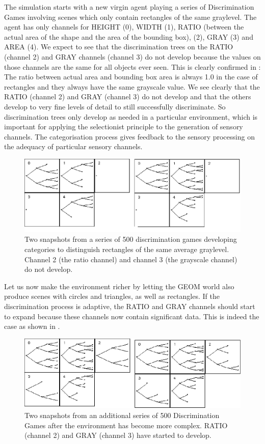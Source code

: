 The simulation starts with a new virgin agent 
playing a series of Discrimination Games involving scenes
which only contain rectangles of the same graylevel. 
The agent has only channels for HEIGHT (0), WIDTH (1), 
RATIO (between the actual area of the shape 
and the area of the bounding box),
(2), GRAY (3) and AREA (4). We expect
to see that the discrimination trees on the RATIO (channel 
2) and GRAY channels (channel 3) do not develop because 
the values on those channels 
are the same for all objects ever seen. This is 
clearly confirmed in : The ratio
between actual area and bounding box area is always 1.0
in the case of rectangles and they always have the same
grayscale value. 
We see clearly that the RATIO (channel 2) and GRAY (channel 3) 
do not develop and that the others develop to very 
fine levels of detail to still successfully discriminate. 
So discrimination trees only 
develop as needed in a particular environment, which is 
important for applying the selectionist
principle to the generation of sensory channels. 
The categorisation process gives feedback to 
the sensory processing on the adequacy of particular sensory 
channels. 

\begin{figure}[htbp]
  \centerline{\includegraphics[width=.65\textwidth]{chap4/figs/adptwrl1.pdf}}
\caption{\label{adptwrl1}Two snapshots 
from a series of 500 discrimination 
games developing categories to distinguish rectangles of 
the same average graylevel. Channel 2 (the ratio channel) 
and channel 3 (the grayscale channel) do not develop.}
\end{figure}

Let us now make the environment richer by letting the 
GEOM world also produce scenes with circles and triangles, 
as well as rectangles. If the discrimination 
process is adaptive, the RATIO and GRAY channels should
start to expand because these channels now contain
significant data. This is indeed the case as shown 
in . 

\begin{figure}[htbp]
  \centerline{\includegraphics[width=.65\textwidth]{chap4/figs/adptwrl2.pdf}}
\caption{\label{adptwrl2}Two snapshots from 
an additional series of 500 Discrimination Games after
the environment has become more complex. RATIO
(channel 2) and GRAY (channel 3) have started to develop.}
\end{figure}

